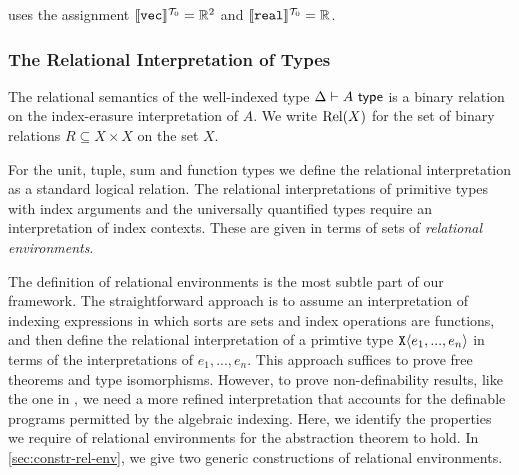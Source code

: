 \begin{example}
  uses the assignment $\llbracket \textup{\texttt{vec}} \rrbracket^{\mathcal{T}_0} = \mathbb{R}^2$ and
  $\llbracket \textup{\texttt{real}} \rrbracket^{\mathcal{T}_0} = \mathbb{R}$.
\end{example}

\subsubsection{The Relational Interpretation of Types}
\label{sec:relational-semantics}

The relational semantics of the well-indexed type
$\Delta \vdash A \textsf{ type}$ is a binary relation on the index-erasure
interpretation of $A$. We write $\mathrm{Rel}(X)$ for the set
of binary relations $R \subseteq X \times X$ on the set $X$.

For the unit, tuple, sum and function types we define the
relational interpretation as a standard logical relation. The
relational interpretations of primitive types with index arguments and
the universally quantified types require an interpretation of index
contexts. %
These are given in terms of sets
of \emph{relational environments}.

The definition of relational environments is the most subtle part of
our framework. The straightforward approach is to assume an
interpretation of indexing expressions in which sorts are
sets and index operations are functions, and then define the
relational interpretation of a primtive type $\textup{\texttt{X}}\langle e_1,...,e_n \rangle$
in terms of the interpretations of $e_1,...,e_n$. This approach
suffices to prove free theorems and type isomorphisms. However, to
prove non-definability results, like the one in
, we need a more refined interpretation
that accounts for the definable programs permitted by the algebraic
indexing. Here, we identify the properties we require of relational
environments for the abstraction theorem to hold. In
\autoref{sec:constr-rel-env}, we give two generic constructions of
relational environments.

